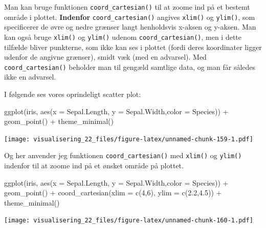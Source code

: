 \documentclass[
]{book}
\newenvironment{Shaded}{\begin{snugshade}}{\end{snugshade}}
\newcommand{\AttributeTok}[1]{\textcolor[rgb]{0.77,0.63,0.00}{#1}}
\newcommand{\DecValTok}[1]{\textcolor[rgb]{0.00,0.00,0.81}{#1}}
\newcommand{\FloatTok}[1]{\textcolor[rgb]{0.00,0.00,0.81}{#1}}
\newcommand{\FunctionTok}[1]{\textcolor[rgb]{0.00,0.00,0.00}{#1}}
\newcommand{\NormalTok}[1]{#1}
\newcommand{\SpecialCharTok}[1]{\textcolor[rgb]{0.00,0.00,0.00}{#1}}
\begin{document}
Man kan bruge funktionen \texttt{coord\_cartesian()} til at zoome ind på et bestemt område i plottet. \textbf{Indenfor} \texttt{coord\_cartesian()} angives \texttt{xlim()} og \texttt{ylim()}, som specificerer de øvre og nedre grænser langt henholdsvis x-aksen og y-aksen. Man kan også bruge \texttt{xlim()} og \texttt{ylim()} udenom \texttt{coord\_cartesian()}, men i dette tilfælde bliver punkterne, som ikke kan ses i plottet (fordi deres koordinater ligger udenfor de angivne grænser), smidt væk (med en advarsel). Med \texttt{coord\_cartesian()} beholder man til gengæld samtlige data, og man får således ikke en advarsel.

I følgende ses vores oprindeligt scatter plot:

\begin{Shaded}
\begin{Highlighting}[]
\FunctionTok{ggplot}\NormalTok{(iris, }\FunctionTok{aes}\NormalTok{(}\AttributeTok{x =}\NormalTok{ Sepal.Length, }\AttributeTok{y =}\NormalTok{ Sepal.Width,}\AttributeTok{color =}\NormalTok{ Species)) }\SpecialCharTok{+}
  \FunctionTok{geom\_point}\NormalTok{() }\SpecialCharTok{+} 
  \FunctionTok{theme\_minimal}\NormalTok{() }
\end{Highlighting}
\end{Shaded}

\texttt{[image: visualisering\_22\_files/figure-latex/unnamed-chunk-159-1.pdf]}

Og her anvender jeg funktionen \texttt{coord\_cartesian()} med \texttt{xlim()} og \texttt{ylim()} indenfor til at zoome ind på et ønsket område på plottet.

\begin{Shaded}
\begin{Highlighting}[]
\FunctionTok{ggplot}\NormalTok{(iris, }\FunctionTok{aes}\NormalTok{(}\AttributeTok{x =}\NormalTok{ Sepal.Length, }\AttributeTok{y =}\NormalTok{ Sepal.Width,}\AttributeTok{color =}\NormalTok{ Species)) }\SpecialCharTok{+}
  \FunctionTok{geom\_point}\NormalTok{() }\SpecialCharTok{+} 
  \FunctionTok{coord\_cartesian}\NormalTok{(}\AttributeTok{xlim =} \FunctionTok{c}\NormalTok{(}\DecValTok{4}\NormalTok{,}\DecValTok{6}\NormalTok{), }\AttributeTok{ylim =} \FunctionTok{c}\NormalTok{(}\FloatTok{2.2}\NormalTok{,}\FloatTok{4.5}\NormalTok{)) }\SpecialCharTok{+}
  \FunctionTok{theme\_minimal}\NormalTok{() }
\end{Highlighting}
\end{Shaded}

\texttt{[image: visualisering\_22\_files/figure-latex/unnamed-chunk-160-1.pdf]}
\end{document}
